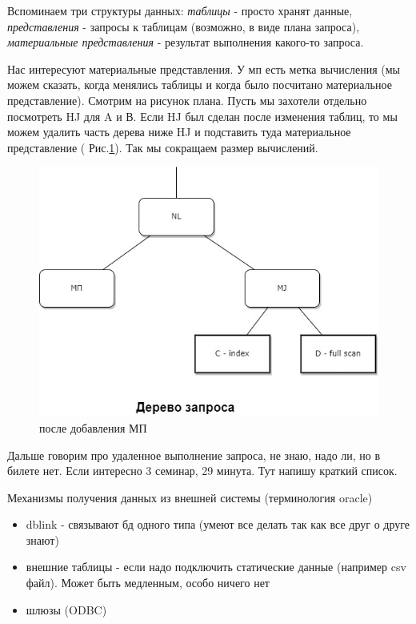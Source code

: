 Вспоминаем три структуры данных: \textit{таблицы} - просто хранят данные, \textit{представления} - запросы к таблицам (возможно, в виде плана запроса), \textit{материальные представления} - результат выполнения какого-то запроса. 

Нас интересуют материальные представления. У мп есть метка вычисления (мы можем сказать, когда менялись таблицы и когда было посчитано материальное представление). Смотрим на рисунок плана. Пусть мы захотели отдельно посмотреть HJ для A и В. Если HJ был сделан после изменения таблиц, то мы можем удалить часть дерева ниже HJ и подставить туда материальное представление ( Рис.\ref{fig:plan2}). Так мы сокращаем размер вычислений.  

\begin{figure}[H]
	\centering
	\includegraphics[scale = 0.5]{5/plan2.jpg}
	\caption{после добавления МП}
	\label{fig:plan2}
\end{figure}

\color{blue} Дальше говорим про удаленное выполнение запроса, не знаю, надо ли, но в билете нет. Если интересно 3 семинар, 29 минута. Тут напишу краткий список. 
\color{black}

Механизмы получения данных из внешней системы (терминология  oracle)
\begin{itemize}
	\item  dblink -  связывают бд одного типа (умеют все делать так как все друг о друге знают)
	\item внешние таблицы - если надо подключить статические данные (например csv файл). Может быть медленным, особо ничего нет
	\item шлюзы (ODBC) 
\end{itemize}